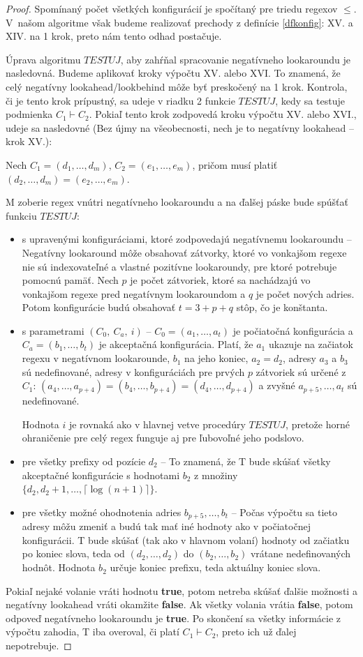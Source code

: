 \begin{proof}
Spomínaný počet všetkých konfigurácií je spočítaný pre triedu regexov $\le$. V~našom algoritme však budeme realizovať prechody z definície \ref{dfkonfig}: XV. a XIV. na 1 krok, preto nám tento odhad postačuje.

Úprava algoritmu $TESTUJ$, aby zahŕňal spracovanie negatívneho lookaroundu je nasledovná. Budeme aplikovať kroky výpočtu XV. alebo XVI. To znamená, že celý negatívny lookahead/lookbehind môže byť preskočený na 1 krok. Kontrola, či je tento krok prípustný, sa udeje v riadku 2 funkcie $TESTUJ$, kedy sa testuje podmienka $C_1\vdash C_2$. Pokiaľ tento krok zodpovedá kroku výpočtu XV. alebo XVI., udeje sa nasledovné (Bez újmy na všeobecnosti, nech je to negatívny lookahead -- krok XV.):

Nech $C_1=(d_1,\dots,d_m)$, $C_2=(e_1,\dots,e_m)$, pričom musí platiť $(d_2,\dots,d_m)=(e_2,\dots,e_m)$. 

M zoberie regex vnútri negatívneho lookaroundu a na ďalšej páske bude spúšťať funkciu $TESTUJ$:
\begin{itemize}
\item s upravenými konfiguráciami, ktoré zodpovedajú negatívnemu lookaroundu -- Negatívny lookaround môže obsahovať zátvorky, ktoré vo vonkajšom regexe nie sú indexovateľné a vlastné pozitívne lookaroundy, pre ktoré potrebuje pomocnú pamäť. Nech $p$ je počet zátvoriek, ktoré sa nachádzajú vo vonkajšom regexe pred negatívnym lookaroundom a $q$ je počet nových adries. Potom konfigurácie budú obsahovať $t=3+p+q$ stôp, čo je konštanta.
\item s parametrami $(C_0,~C_a,~i)$ -- $C_0 = (a_1,\dots,a_t)$ je počiatočná konfigurácia a $C_a=(b_1,\dots,b_t)$ je akceptačná konfigurácia. Platí, že $a_1$ ukazuje na začiatok regexu v negatívnom lookarounde, $b_1$ na jeho koniec, $a_2=d_2$, adresy $a_3$ a $b_3$ sú nedefinované, adresy v konfiguráciách pre prvých $p$ zátvoriek sú určené z $C_1$: $(a_4,\dots,a_{p+4}) = (b_4,\dots,b_{p+4}) = (d_4,\dots,d_{p+4})$ a zvyšné $a_{p+5},\dots,a_t$ sú nedefinované.

Hodnota $i$ je rovnaká ako v hlavnej vetve procedúry $TESTUJ$, pretože horné ohraničenie pre celý regex funguje aj pre ľubovoľné jeho podslovo.
\item pre všetky prefixy od pozície $d_2$ -- To znamená, že T bude skúšať všetky akceptačné konfigurácie s hodnotami $b_2$ z množiny $\lbrace d_2, d_2+1,\dots,\lceil \log(n+1)\rceil\rbrace$.
\item pre všetky možné ohodnotenia adries $b_{p+5},\dots,b_t$ -- Počas výpočtu sa tieto adresy môžu zmeniť a budú tak mať iné hodnoty ako v počiatočnej konfigurácii. T bude skúšať (tak ako v hlavnom volaní) hodnoty od začiatku po koniec slova, teda od $(d_2,\dots,d_2)$ do $(b_2,\dots,b_2)$ vrátane nedefinovaných hodnôt. Hodnota $b_2$ určuje koniec prefixu, teda aktuálny koniec slova.
\end{itemize}
Pokiaľ nejaké volanie vráti hodnotu \textbf{true}, potom netreba skúšať ďalšie možnosti a negatívny lookahead vráti okamžite \textbf{false}. Ak všetky volania vrátia \textbf{false}, potom odpoveď negatívneho lookaroundu je \textbf{true}. Po skončení sa všetky informácie z výpočtu zahodia, T iba overoval, či platí $C_1\vdash C_2$, preto ich už ďalej nepotrebuje.


\end{proof}
